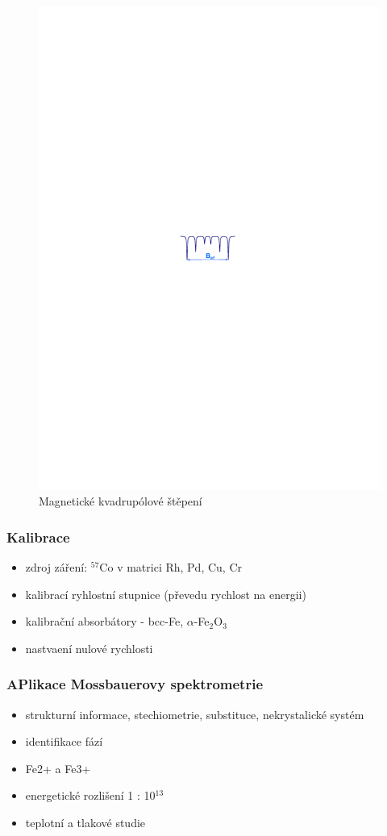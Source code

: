 \begin{figure}[H]
   \centering
   \includegraphics[width=0.5\linewidth, trim={5cm 14cm 5cm 14cm}, clip]{img/mossbauer_magnetic_quadrupole.pdf}
   \caption{Magnetické kvadrupólové štěpení}
   \label{fig:6_2_mossbauer_magnetic_quadrupole}
\end{figure}

\subsubsection{Kalibrace}

\begin{itemize}
   \item zdroj záření: $^{57}$Co v matrici Rh, Pd, Cu, Cr
   \item kalibrací ryhlostní stupnice (převedu rychlost na energii)
   \item kalibrační absorbátory - bcc-Fe, $\alpha$-Fe$_2$O$_3$
   \item nastvaení nulové rychlosti
\end{itemize}

\subsubsection{APlikace Mossbauerovy spektrometrie}

\begin{itemize}
   \item strukturní informace, stechiometrie, substituce, nekrystalické systém
   \item identifikace fází
   \item Fe2+ a Fe3+
   \item energetické rozlišení 1 : 10$^{13}$
   \item teplotní a tlakové studie
\end{itemize}

